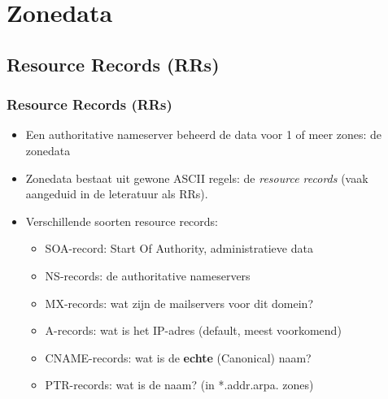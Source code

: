 \section{Zonedata}
\subsection{Resource Records (RRs)}
\begin{styleframe}
        \frametitle{Resource Records (RRs)}
\begin{itemize}
        \item Een authoritative nameserver beheerd de data voor 1 of meer zones: de zonedata
        \item Zonedata bestaat uit gewone ASCII regels: de {\it resource records} (vaak aangeduid in de leteratuur als RRs).
	\pause
        \item Verschillende soorten resource records:
	\begin{itemize}
		\item SOA-record: Start Of Authority, administratieve data
		\item NS-records: de authoritative nameservers
		\item MX-records: wat zijn de mailservers voor dit domein?
		\item A-records: wat is het IP-adres (default, meest voorkomend)
		\item CNAME-records: wat is de {\bf echte} (Canonical) naam? 
		\item PTR-records: wat is de naam? (in *.addr.arpa. zones)
	\end{itemize}
\end{itemize}
\end{styleframe}

